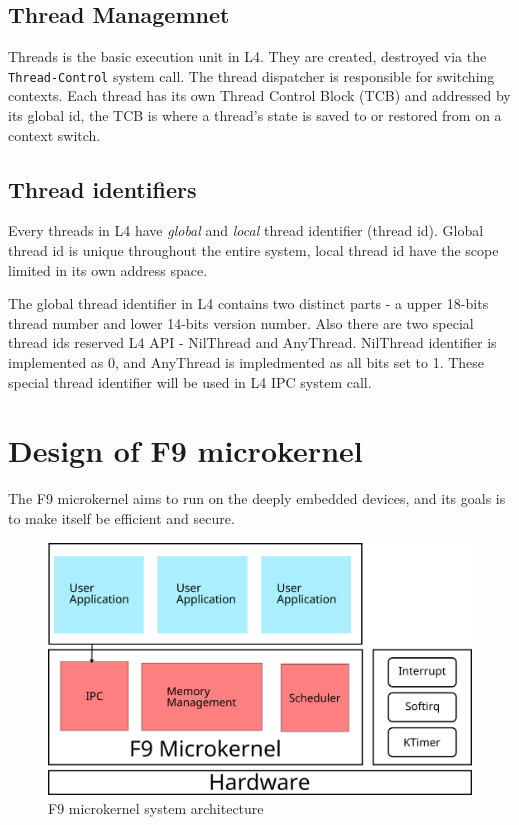 \documentclass[10pt,preprint,nocopyrightspace]{sigplanconf}
\begin{document}
\subsection{Thread Managemnet}

Threads is the basic execution unit in L4. They are created, destroyed via the \verb|Thread-Control| system call\cite{nourai2005aphysically}. The thread dispatcher is responsible for switching contexts. Each thread has its own Thread Control Block (TCB) and addressed by its global id, the TCB is where a thread's state is saved to or restored from on a context switch\cite{nourai2005aphysically}.

\subsection{Thread identifiers}

Every threads in L4 have \textit{global} and \textit{local} thread identifier (thread id). Global thread id is unique throughout the entire system, local thread id have the scope limited in its own address space.

The global thread identifier in L4 contains two distinct parts - a upper 18-bits thread number and lower 14-bits version number. Also there are two special thread ids reserved L4 API - NilThread and AnyThread. NilThread identifier is implemented as 0, and AnyThread is impledmented as all bits set to 1. These special thread identifier will be used in L4 IPC system call\cite{nourai2005aphysically}.

\section{Design of F9 microkernel}

The F9 microkernel aims to run on the deeply embedded devices, and its goals is to make itself be efficient and secure.

\begin{figure}[H]
	\begin{center}
		\includegraphics[width=\linewidth]{picture/f9_arch.png}
	\end{center}
	\caption{F9 microkernel system architecture}
	\label{fig:f9}
\end{figure}
\end{document}
